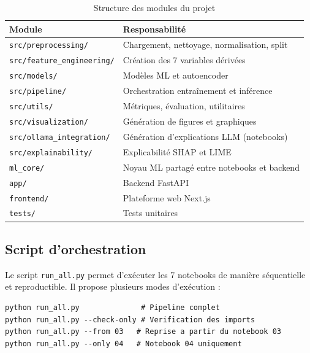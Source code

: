 \documentclass[12pt,a4paper,twoside]{report}
\begin{document}
\begin{table}[H]
\centering
\caption{Structure des modules du projet}
\label{tab:modules}
\begin{tabular}{ll}
\toprule
\textbf{Module}                       & \textbf{Responsabilité} \\
\midrule
\texttt{src/preprocessing/}           & Chargement, nettoyage, normalisation, split \\
\texttt{src/feature\_engineering/}    & Création des 7 variables dérivées \\
\texttt{src/models/}                  & Modèles ML et autoencoder \\
\texttt{src/pipeline/}                & Orchestration entraînement et inférence \\
\texttt{src/utils/}                   & Métriques, évaluation, utilitaires \\
\texttt{src/visualization/}           & Génération de figures et graphiques \\
\texttt{src/ollama\_integration/}     & Génération d'explications LLM (notebooks) \\
\texttt{src/explainability/}          & Explicabilité SHAP et LIME \\
\texttt{ml\_core/}                    & Noyau ML partagé entre notebooks et backend \\
\texttt{app/}                         & Backend FastAPI \\
\texttt{frontend/}                    & Plateforme web Next.js \\
\texttt{tests/}                       & Tests unitaires \\
\bottomrule
\end{tabular}
\end{table}

\subsection{Script d'orchestration}

Le script \texttt{run\_all.py} permet d'exécuter les 7 notebooks de manière séquentielle et reproductible. Il propose plusieurs modes d'exécution :

\begin{lstlisting}[caption={Options du script run\_all.py},label={lst:run_all}]
python run_all.py              # Pipeline complet
python run_all.py --check-only # Verification des imports
python run_all.py --from 03   # Reprise a partir du notebook 03
python run_all.py --only 04   # Notebook 04 uniquement
\end{lstlisting}
\end{document}
